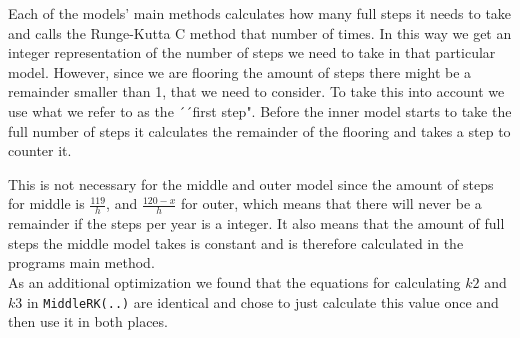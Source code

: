 Each of the models' main methods calculates how many full steps it needs to take and calls the Runge-Kutta C method that number of times. In this way we get an integer representation of the number of steps we need to take in that particular model. However, since we are flooring the amount of steps there might be a remainder smaller than 1, that we need to consider. To take this into account we use what we refer to as the ´´first step". Before the inner model starts to take the full number of steps it calculates the remainder of the flooring and takes a step to counter it.

This is not necessary for the middle and outer model since the amount of steps for middle is $\frac{119}{h}$, and $\frac{120-x}{h}$ for outer, which means that there will never be a remainder if the steps per year is a integer. It also means that the amount of full steps the middle model takes is constant and is therefore calculated in the programs main method. \\

As an additional optimization we found that the equations for calculating $k2$ and $k3$ in \texttt{MiddleRK(..)} are identical and chose to just calculate this value once and then use it in both places.
